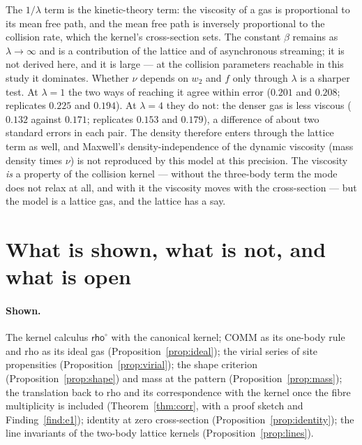 \documentclass[11pt,a4paper]{article}
\theoremstyle{plain}
\theoremstyle{definition}
\theoremstyle{remark}
\newcommand{\rhoc}{\textsf{rho}}
\newcommand{\krho}{\textsf{rho}^{\circ}}
\begin{document}
The $1/\lambda$ term is the kinetic-theory term: the viscosity of a gas is
proportional to its mean free path, and the mean free path is inversely
proportional to the collision rate, which the kernel's cross-section sets. The
constant $\beta$ remains as $\lambda\to\infty$ and is a contribution of the
lattice and of asynchronous streaming; it is not derived here, and it is large
--- at the collision parameters reachable in this study it dominates. Whether
$\nu$ depends on $w_2$ and $f$ only through $\lambda$ is a sharper test. At
$\lambda=1$ the two ways of reaching it agree within error
($0.201$ and $0.208$; replicates $0.225$ and $0.194$). At $\lambda=4$ they do not:
the denser gas is less viscous ($0.132$ against $0.171$; replicates $0.153$
and $0.179$), a difference of about two standard errors in each pair. The density
therefore enters through the lattice term as well, and Maxwell's
density-independence of the dynamic viscosity (mass density times $\nu$) is not reproduced
by this model at this precision. The viscosity \emph{is} a property of the
collision kernel --- without the three-body term the mode does not relax at
all, and with it the viscosity moves with the cross-section --- but the model
is a lattice gas, and the lattice has a say.

\section{What is shown, what is not, and what is open}\label{sec:status}

\paragraph{Shown.} The kernel calculus $\krho$ with the canonical kernel;
COMM as its one-body rule and \rhoc{} as its ideal gas
(Proposition~\ref{prop:ideal}); the virial series of site propensities
(Proposition~\ref{prop:virial}); the shape criterion
(Proposition~\ref{prop:shape}) and mass at the pattern
(Proposition~\ref{prop:mass}); the translation back to \rhoc{} and its
correspondence with the kernel once the fibre multiplicity is included
(Theorem~\ref{thm:corr}, with a proof sketch and Finding~\ref{find:e1});
identity at zero cross-section (Proposition~\ref{prop:identity}); the line
invariants of the two-body lattice kernels (Proposition~\ref{prop:lines}).
\end{document}
